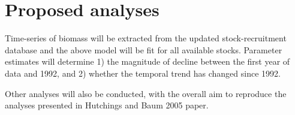 \documentclass[letterpaper,12pt]{article}
\begin{document}
\section{Proposed analyses}

Time-series of biomass will be extracted from the updated stock-recruitment database and the above model will be fit for all available stocks. Parameter estimates will determine 1) the magnitude of decline between the first year of data and 1992, and 2) whether the temporal trend has changed since 1992.

Other analyses will also be conducted, with the overall aim to reproduce the analyses presented in Hutchings and Baum 2005 paper.
\end{document}
